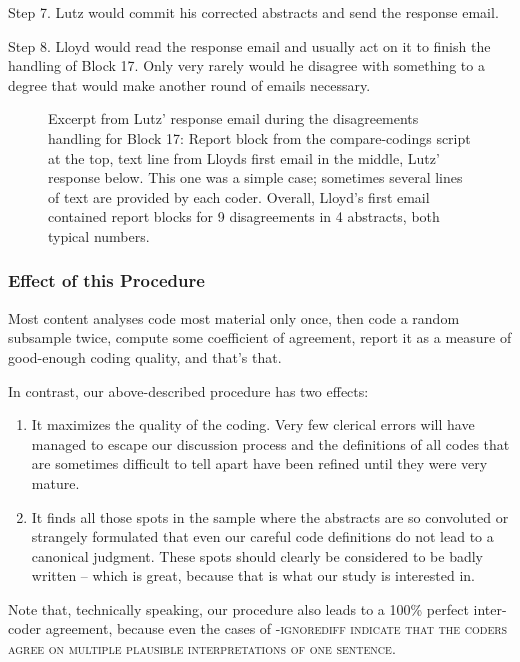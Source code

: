 \documentclass[10pt,journal,compsoc]{IEEEtran}
\newcommand{\Cb}[1]{\bgroup\scshape #1\egroup}  %
\newcommand{\Prg}[1]{\bgroup\ttfamily #1\egroup}  %
\begin{document}
Step 7. Lutz would commit his corrected abstracts and send the response email.

Step 8. Lloyd would read the response email and usually act on it to finish the handling of
Block 17.
Only very rarely would he disagree with something to a degree that would make
another round of emails necessary.

\begin{figure}[tbp]%
	\centering{}%
	\vspace{-2mm}\caption{Excerpt from Lutz' response email during the disagreements handling
		for Block 17:
		Report block from the \Prg{compare-codings} script at the top,
		text line from Lloyds first email in the middle,
		Lutz' response below.
		This one was a simple case;
		sometimes several lines of text are provided by each coder.
		Overall, Lloyd's first email contained report blocks for 9 disagreements
		in 4 abstracts, both typical numbers.}\label{email-MeyAlmKel22.png}%
\end{figure}


\subsubsection{Effect of this Procedure}

Most content analyses code most material only once,
then code a random subsample twice,
compute some coefficient of agreement,
report it as a measure of good-enough coding quality,
and that's that.

In contrast, our above-described procedure has two effects:
\begin{enumerate}
	\item It maximizes the quality of the coding.
	  Very few clerical errors will have managed to escape our discussion process
	  and the definitions of all codes that are sometimes difficult to tell apart
	  have been refined until they were very mature.
	\item It finds all those spots in the sample where the abstracts are so convoluted
	  or strangely formulated that even our careful code definitions do not lead
	  to a canonical judgment.
	  These spots should clearly be considered to be badly written -- which is great,
	  because that is what our study is interested in.
\end{enumerate}
Note that, technically speaking, our procedure also leads to a 100\% perfect inter-coder agreement,
because even the cases of \Cb{-ignorediff} indicate that
the coders agree on multiple plausible interpretations of one sentence.
\end{document}
